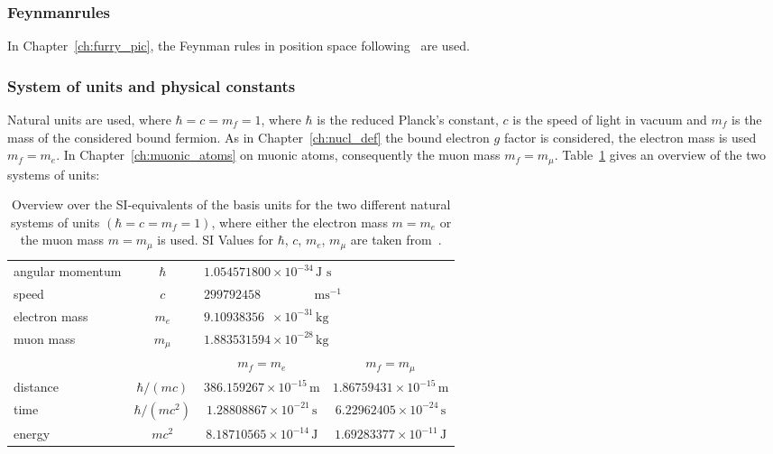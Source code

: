 \subsubsection{Feynmanrules}
In Chapter~\ref{ch:furry_pic}, the Feynman rules in position space following~\cite{itzykson2005} are used.

\newpage
\subsubsection{System of units and physical constants}
Natural units are used, where $\hbar=c=m_f=1$, where $\hbar$ is the reduced Planck's constant, $c$ is the speed of light in vacuum and $m_f$ is the mass of the considered bound fermion. As in Chapter~\ref{ch:nucl_def} the bound electron $g$ factor is considered, the electron mass is used $m_f=m_e$. In Chapter~\ref{ch:muonic_atoms} on muonic atoms, consequently the muon mass $m_f=m_\mu$. Table~\ref{tab:units} gives an overview of the two systems of units:\\[1.5cm]

\begin{table}[h]
\caption{\label{tab:units}Overview over the SI-equivalents of the basis units for the two different natural systems of units $(\hbar=c=m_f=1)$, where either the electron mass $m=m_e$ or the muon mass $m=m_\mu$ is used. SI Values for $\hbar$, $c$, $m_e$, $m_\mu$ are taken from~\cite{codata2016}.}
\centering\setcellgapes{4pt}\makegapedcells
\begin{tabular}{lc|c|c}
\\
angular momentum &$\hbar$ & \multicolumn{2}{l}{$1.054571800 \times 10^{-34} \,\text{J s}$} \\
speed &$c$ & \multicolumn{2}{l}{$299792458 \,\phantom{\times 1001 ^{-34}} \text{ms}^{-1}$}\\
electron mass &$m_e$ & \multicolumn{2}{l}{$9.10938356\phantom{0}\times 10^{-31}\, \text{kg} $}\\
muon mass &$m_\mu$ & \multicolumn{2}{l}{$1.883531594 \times 10^{-28} \,\text{kg}$}\\[15pt]
&& $m_f=m_e$ & $m_f=m_\mu$ \\\cline{3-4}
distance & $\hbar/(mc)$ & $386.159267\times10^{-15} \,\text{m}$ & $1.86759431\times 10^{-15}\,\text{m}$\\
time & $\hbar /(m c^2)$ & $1.28808867\times 10^{-21}\,\text{s}$ & $6.22962405\times 10^{-24}\,\text{s}$\\
energy & $mc^2$ & $8.18710565\times 10^{-14}\,\text{J}$ & $1.69283377\times 10^{-11}\,\text{J}$\\
\end{tabular}
\end{table}

